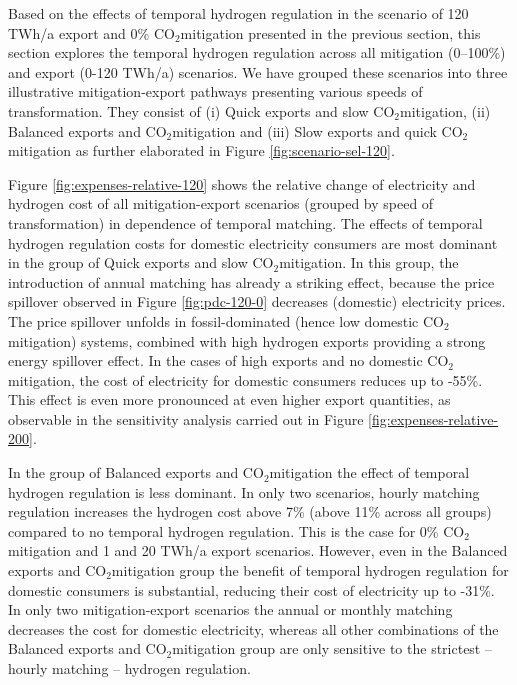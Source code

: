 \documentclass[5p,numafflabel]{elsarticle}
\newcommand{\co}{\ce{CO2}~}
\def\co{CO${}_2${\:}}
\begin{document}
Based on the effects of temporal hydrogen regulation in the scenario of 120 TWh/a export and 0\% \co mitigation presented in the previous section, this section explores the temporal hydrogen regulation across all mitigation (0--100\%) and export (0-120 TWh/a) scenarios. We have grouped these scenarios into three illustrative mitigation-export pathways presenting various speeds of transformation. They consist of 
(i) Quick exports and slow \co mitigation,
(ii) Balanced exports and \co mitigation and
(iii) Slow exports and quick \co mitigation as further elaborated in Figure \ref{fig:scenario-sel-120}.

Figure \ref{fig:expenses-relative-120} shows the relative change of electricity and hydrogen cost of all mitigation-export scenarios (grouped by speed of transformation) in dependence of temporal matching. 
The effects of temporal hydrogen regulation costs for domestic electricity consumers are most dominant in the group of Quick exports and slow \co mitigation.
In this group, the introduction of annual matching has already a striking effect, because the price spillover observed in Figure \ref{fig:pdc-120-0} decreases (domestic) electricity prices. The price spillover unfolds in fossil-dominated (hence low domestic \co mitigation) systems, combined with high hydrogen exports providing a strong energy spillover effect. In the cases of high exports and no domestic \co mitigation, the cost of electricity for domestic consumers reduces up to -55\%.
This effect is even more pronounced at even higher export quantities, as observable in the sensitivity analysis carried out in Figure \ref{fig:expenses-relative-200}.

In the group of Balanced exports and \co mitigation the effect of temporal hydrogen regulation is less dominant.
In only two scenarios, hourly matching regulation increases the hydrogen cost above 7\% (above 11\% across all groups) compared to no temporal hydrogen regulation. This is the case for 0\% \co mitigation and 1 and 20 TWh/a export scenarios. 
However, even in the Balanced exports and \co mitigation group the benefit of temporal hydrogen regulation for domestic  consumers is substantial, reducing their cost of electricity up to -31\%. In only two mitigation-export scenarios the annual or monthly matching decreases the cost for domestic electricity, whereas all other combinations of the Balanced exports and \co mitigation group are only sensitive to the strictest -- hourly matching -- hydrogen regulation. 
\end{document}

